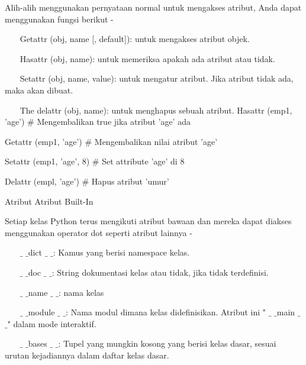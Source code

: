 {Alih-alih menggunakan pernyataan normal untuk mengakses atribut, Anda dapat menggunakan fungsi berikut - \par
\vspace{12pt}
\noindent 
~~~ Getattr (obj, name [, default]): untuk mengakses atribut objek. \par
\vspace{12pt}
\noindent 
~~~ Hasattr (obj, name): untuk memeriksa apakah ada atribut atau tidak. \par
\vspace{12pt}
\noindent 
~~~ Setattr (obj, name, value): untuk mengatur atribut. Jika atribut tidak ada, maka akan dibuat. \par
\vspace{12pt}
\noindent 
~~~ The delattr (obj, name): untuk menghapus sebuah atribut. \pa
\vspace{12pt}
\noindent 
Hasattr (emp1, 'age')  $  \#  $ Mengembalikan true jika atribut 'age' ada \par
\noindent 
Getattr (emp1, 'age')  $  \#  $ Mengembalikan nilai atribut 'age' \par
\noindent 
Setattr (emp1, 'age', 8)  $  \#  $ Set attribute 'age' di 8 \par
\noindent 
Delattr (empl, 'age')  $  \#  $ Hapus atribut 'umur' \par
\vspace{12pt}
\noindent 
Atribut Atribut Built-In \par
\vspace{12pt}
\noindent 

Setiap kelas Python terus mengikuti atribut bawaan dan mereka dapat diakses menggunakan operator dot seperti atribut lainnya - \par
\vspace{12pt}
\noindent 
~~~  $  \_  $ $  \_  $dict $  \_  $ $  \_  $: Kamus yang berisi namespace kelas. \par
\vspace{12pt}
\noindent 
~~~  $  \_  $ $  \_  $doc $  \_  $ $  \_  $: String dokumentasi kelas atau tidak, jika tidak terdefinisi. \par
\vspace{12pt}
\noindent 
~~~  $  \_  $ $  \_  $name $  \_  $ $  \_  $: nama kelas \par
\vspace{12pt}
\noindent 
~~~  $  \_  $ $  \_  $module $  \_  $ $  \_  $: Nama modul dimana kelas didefinisikan. Atribut ini " $  \_  $ $  \_  $main $  \_  $ $  \_  $" dalam mode interaktif. \par
\vspace{12pt}
\noindent 
~~~  $  \_  $ $  \_  $bases $  \_  $ $  \_  $: Tupel yang mungkin kosong yang berisi kelas dasar, sesuai urutan kejadiannya dalam daftar kelas dasar. \par
\vspace{12pt}
\noindent 

}
